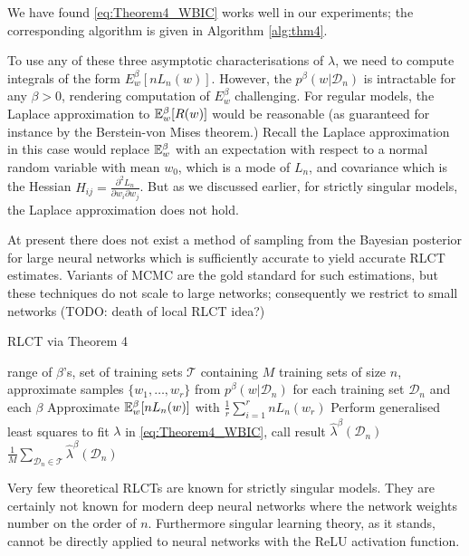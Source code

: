 \documentclass{article} %
\begin{document}
 We have found \eqref{eq:Theorem4_WBIC} works well in our experiments; the corresponding algorithm is given in Algorithm \ref{alg:thm4}. 

To use any of these three asymptotic characterisations of $\lambda$, we need to compute integrals of the form $E_w^\beta [n L_n(w)]$. However, the $p^\beta(w|\mathcal D_n)$ is intractable for any $\beta>0$, rendering computation of $E_w^\beta$ challenging. For regular models, the Laplace approximation to ${\mathbb{E}}_w^\beta [R(w)]$ would be reasonable (as guaranteed for instance by the Berstein-von Mises theorem.) Recall the Laplace approximation in this case would replace ${\mathbb{E}}_w^\beta$ with an expectation with respect to a normal random variable with mean $w_0$, which is a mode of $L_n$, and covariance which is the Hessian $H_{ij} =\frac{\partial^2 L_n}{\partial w_i \partial w_j}$. But as we discussed earlier, for strictly singular models, the Laplace approximation does not hold. 

At present there does not exist a method of sampling from the Bayesian posterior for large neural networks which is sufficiently accurate to yield accurate RLCT estimates. Variants of MCMC are the gold standard for such estimations, but these techniques do not scale to large networks; consequently we restrict to small networks (TODO: death of local RLCT idea?)

\begin{algorithm}[tb]
	\caption{RLCT via Theorem 4}
	\label{alg:thm4}
	\begin{algorithmic}
		 range of $\beta$'s, set of training sets $\mathcal T$ containing $M$ training sets of size $n$, approximate samples $\{w_1,\ldots,w_r\}$ from $p^\beta(w|\mathcal D_n)$ for each training set $\mathcal D_n$ and each $\beta$
        		\STATE Approximate ${\mathbb{E}}_w^\beta [nL_n(w)]$ with $\frac{1}{r} \sum_{i=1}^r nL_n(w_r)$
    		\ENDFOR
    		\STATE Perform generalised least squares to fit $\lambda$ in \eqref{eq:Theorem4_WBIC}, call result $\hat \lambda^\beta(\mathcal D_n)$
		\ENDFOR
		 $\frac{1}{M} \sum_{\mathcal D_n \in \mathcal T} \hat \lambda^\beta(\mathcal D_n)$
	\end{algorithmic}
\end{algorithm}

Very few theoretical RLCTs are known for strictly singular models. They are certainly not known for modern deep neural networks where the network weights number on the order of $n$. Furthermore singular learning theory, as it stands, cannot be directly applied to neural networks with the ReLU activation function. 
\end{document}
